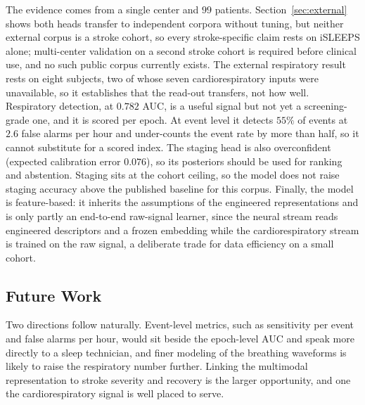 \documentclass{ieeeaccess}
\newcommand{\mmAuc}{0.782}   %
\begin{document}
The evidence comes from a single center and $99$ patients. Section~\ref{sec:external} shows both heads
transfer to independent corpora without tuning, but neither external corpus is a stroke
cohort, so every stroke-specific claim rests on iSLEEPS alone; multi-center validation on
a second stroke cohort is required before clinical use, and no such public corpus
currently exists. The external respiratory result rests on eight subjects, two of whose
seven cardiorespiratory inputs were unavailable, so it establishes that the read-out
transfers, not how well. Respiratory detection, at $\mmAuc$ AUC, is a useful signal but not yet a
screening-grade one, and it is scored per epoch. At
event level it detects $55\%$ of events at $2.6$ false alarms per hour and under-counts
the event rate by more than half, so it cannot substitute for a scored index. The
staging head is also overconfident (expected calibration error $0.076$), so its
posteriors should be used for ranking and abstention. Staging sits at
the cohort ceiling, so the model does not raise staging accuracy above the published
baseline for this corpus. Finally, the model is feature-based: it inherits the assumptions of the engineered
representations and is only partly an end-to-end raw-signal learner, since the neural stream reads
engineered descriptors and a frozen embedding while the cardiorespiratory stream is trained on
the raw signal, a deliberate trade for data
efficiency on a small cohort.

\subsection{Future Work}
Two directions follow naturally. Event-level metrics, such as sensitivity per event and false
alarms per hour, would sit beside the epoch-level AUC and speak more directly to a sleep
technician, and finer modeling of the breathing waveforms is likely to raise the respiratory
number further. Linking the multimodal representation to stroke severity and recovery is the
larger opportunity, and one the cardiorespiratory signal is well placed to serve.
\end{document}
